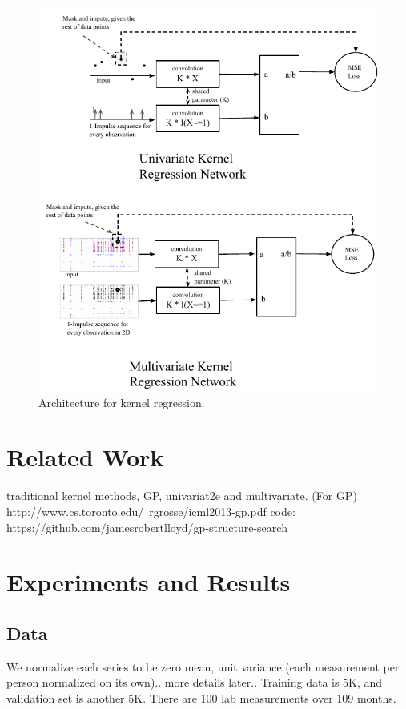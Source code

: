 \documentclass{article} %
\begin{document}
\begin{figure}[h]
\begin{center}
\includegraphics[width=\textwidth]{img/kernel_regression_images-crop.pdf}
\end{center}
\caption{Architecture for kernel regression.}\label{fig:arch}
\end{figure}


\section{Related Work}
traditional kernel methods, GP, univariat2e and multivariate.
(For GP)
http://www.cs.toronto.edu/~rgrosse/icml2013-gp.pdf
code: https://github.com/jamesrobertlloyd/gp-structure-search


\section{Experiments and Results}
\subsection{Data}
We normalize each series to be zero mean, unit variance (each measurement per person normalized on its own).. more details later..
Training data is 5K, and validation set is another 5K. There are 100 lab measurements over 109 months. 
\end{document}
